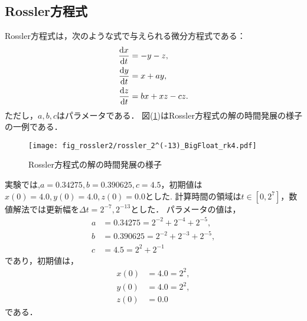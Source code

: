 \subsection{Rossler方程式}
Rossler方程式は，次のような式で与えられる微分方程式である：
\begin{align}
    \frac{\mathrm{d}x}{\mathrm{d}t} &= -y-z, \\
    \frac{\mathrm{d}y}{\mathrm{d}t} &= x+ay, \\
    \frac{\mathrm{d}z}{\mathrm{d}t} &= bx + xz - cz.
\end{align}
ただし，$a,b,c$はパラメータである．
図(\ref{fig:rossler})はRossler方程式の解の時間発展の様子の一例である．
\begin{figure}[H]
    \centering
    \texttt{[image: fig\_rossler2/rossler\_2^(-13)\_BigFloat\_rk4.pdf]}
    \caption{Rossler方程式の解の時間発展の様子}
    \label{fig:rossler}
\end{figure}
実験では,$a=0.34275, b=0.390625, c=4.5$，初期値は$x(0) = 4.0, y(0) = 4.0, z(0) = 0.0$とした.
計算時間の領域は$t \in [0, 2^7]$，数値解法では更新幅を$\Delta t =   2^{-7},2^{-13}$とした．
パラメータの値は，
\begin{align}
    a &= 0.34275 = 2^{-2} + 2^{-4} + 2^{-5},\\
    b &= 0.390625 = 2^{-2} + 2^{-3} + 2^{-5},\\ 
    c &= 4.5 = 2^2 + 2^{-1}
\end{align}
であり，初期値は，
\begin{align}
    x(0) &= 4.0 = 2^2,\\
    y(0) &= 4.0 = 2^2 ,\\
    z(0) &= 0.0 
\end{align}
である．
